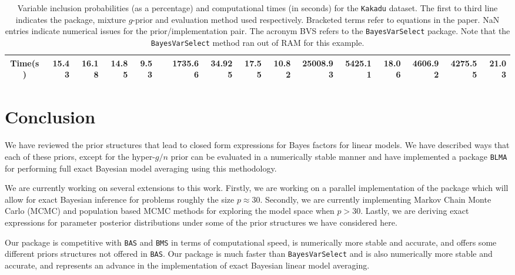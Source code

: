\documentclass[12pt]{article}
\begin{document}
\begin{sidewaystable}[h!]
\begin{center}
{\begin{tabular}{c|r|r|rrrrrr|rrrr|rrr}
Time(s) & 15.43 & 16.18 & 14.85  &  9.53   &       & 1735.66  & 34.925  &   17.55 &  10.82         &  25008.93 & 
5425.11  &   18.06   & 4606.92       &  4275.55  & 21.03  \\ 
	\hline
\end{tabular}
}
\end{center}
	\caption{Variable inclusion probabilities (as a percentage) and computational times (in seconds) for the {\tt Kakadu} dataset.
	The first to third line indicates the package, mixture $g$-prior and evaluation method used respectively. Bracketed terms
	refer to equations in the paper. NaN entries indicate numerical issues for the prior/implementation pair. The acronym BVS refers to the {\tt BayesVarSelect} package. Note that 
	the {\tt BayesVarSelect} method ran out of RAM for this example.}
\label{tab:Kakadu}
\end{sidewaystable}

 
\section{Conclusion}
\label{sec:conclusion}

We have reviewed the prior structures that lead to closed form expressions for Bayes factors for
linear models. We have described ways that each of these priors, except for the hyper-$g/n$ 
prior can be evaluated in a numerically stable manner and have implemented a package 
{\tt BLMA} for performing full exact Bayesian model averaging using
this methodology. 

We are currently working on several extensions to this work. Firstly, we are working on a
parallel implementation of the package which will allow for exact Bayesian inference for
problems roughly the size $p\approx 30$. Secondly, we are currently implementing  Markov
Chain Monte Carlo (MCMC) and population based MCMC methods for exploring the model space
when $p>30$. Lastly, we are deriving exact expressions for parameter posterior distributions
under some of the prior structures we have considered here.


Our package is competitive with {\tt BAS} and {\tt BMS} in terms of computational speed,
is numerically more stable and accurate, and offers some different priors structures not
offered in {\tt BAS}. Our package is much faster than {\tt BayesVarSelect} and is also
numerically more stable and accurate, and represents an advance in the implementation of
exact Bayesian linear model averaging.





 
 

 
\end{document}
